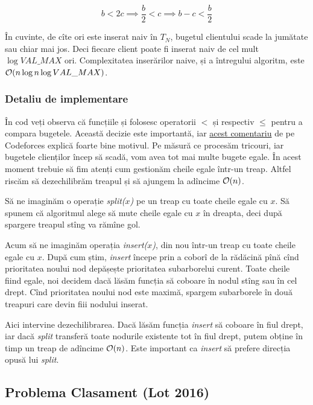 \documentclass[../main.tex]{subfiles}
\begin{document}
$$b < 2c \implies \frac{b}{2} < c \implies b - c < \frac{b}{2}$$

În cuvinte, de cîte ori este inserat naiv în $T_N$, bugetul clientului scade la jumătate sau chiar mai jos. Deci fiecare client poate fi inserat naiv de cel mult $\log VAL\_MAX$ ori. Complexitatea inserărilor naive, și a întregului algoritm, este $\mathcal{O}(n \log n \log VAL\_MAX)$.

\subsubsection*{Detaliu de implementare}

În cod veți observa că funcțiile  și  folosesc operatorii $<$ și respectiv $\leq$ pentru a compara bugetele. Această decizie este importantă, iar \href{https://codeforces.com/blog/entry/92340#comment-814503}{acest comentariu} de pe Codeforces explică foarte bine motivul. Pe măsură ce procesăm tricouri, iar bugetele clienților încep să scadă, vom avea tot mai multe bugete egale. În acest moment trebuie să fim atenți cum gestionăm cheile egale într-un treap. Altfel riscăm să dezechilibrăm treapul și să ajungem la adîncime $\mathcal{O}(n)$.

Să ne imaginăm o operație \textit{split($x$)} pe un treap cu toate cheile egale cu $x$. Să spunem că algoritmul alege să mute cheile egale cu $x$ în dreapta, deci după spargere treapul stîng va rămîne gol.

Acum să ne imaginăm operația \textit{insert($x$)}, din nou într-un treap cu toate cheile egale cu $x$. După cum știm, \textit{insert} începe prin a coborî de la rădăcină pînă cînd prioritatea noului nod depășește prioritatea subarborelui curent. Toate cheile fiind egale, noi decidem dacă lăsăm funcția să coboare în nodul stîng sau în cel drept. Cînd prioritatea noului nod este maximă, spargem subarborele în două treapuri care devin fiii nodului inserat.

Aici intervine dezechilibrarea. Dacă lăsăm funcția \textit{insert} să coboare în fiul drept, iar dacă \textit{split} transferă toate nodurile existente tot în fiul drept, putem obține în timp un treap de adîncime $\mathcal{O}(n)$. Este important ca \textit{insert} să prefere direcția opusă lui \textit{split}.


\subsection{Problema Clasament (Lot 2016)}
\label{problem:clasament}
\end{document}
